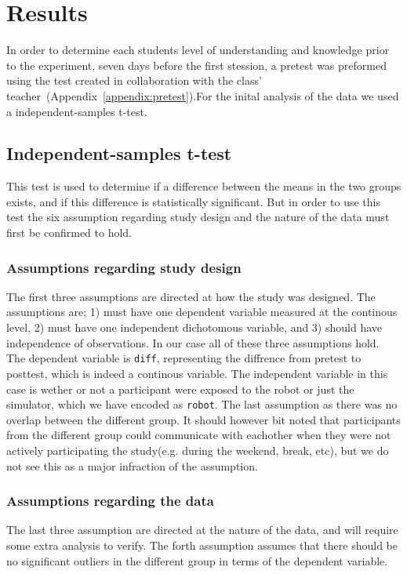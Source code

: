 \chapter{Results}
In order to determine each students level of understanding and knowledge prior to the experiment, seven days before the first stession, a pretest was preformed using the test created in collaboration with the class' teacher~(Appendix~\ref{appendix:pretest}).For the inital analysis of the data we used a independent-samples t-test.

\section{Independent-samples t-test}
This test is used to determine if a difference between the means in the two groups exists, and if this difference is statistically significant.
But in order to use this test the six assumption regarding study design and the nature of the data must first be confirmed to hold.

\subsection{Assumptions regarding study design}
The first three assumptions are directed at how the study was designed.
The assumptions are; 
1) must have one dependent variable measured at the continous level, 2) must have one independent dichotomous variable, and 3) should have independence of observations. In our case all of these three assumptions hold. The dependent variable is \texttt{diff}, representing the diffrence from pretest to posttest, which is indeed a continous variable. The independent variable in this case is wether or not a participant were exposed to the robot or just the simulator, which we have encoded as \texttt{robot}. The last assumption as there was no overlap between the different group. It should however bit noted that participants from the different group could communicate with eachother when they were not actively participating the study(e.g. during the weekend, break, etc), but we do not see this as a major infraction of the assumption.

\subsection{Assumptions regarding the data}
The last three assumption are directed at the nature of the data, and will require some extra analysis to verify. The forth assumption assumes that there should be no significant outliers in the different group in terms of the dependent variable. 

